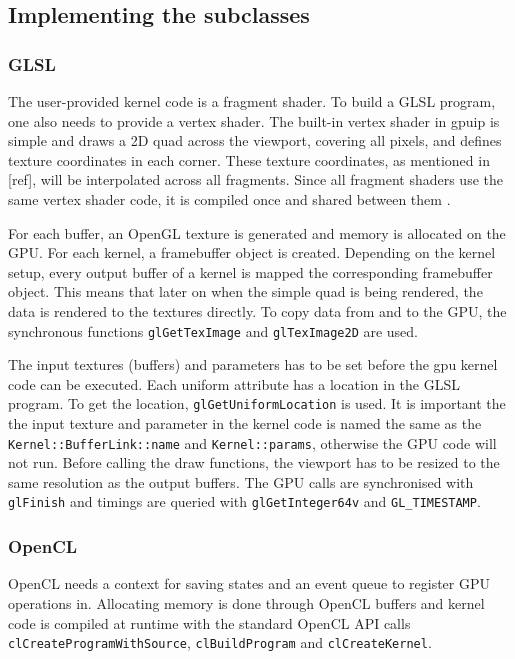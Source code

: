 \subsection{Implementing the subclasses}
\subsubsection{GLSL}
The user-provided kernel code is a fragment shader. To build a GLSL program, one also needs to provide a vertex shader. The built-in vertex shader in gpuip is simple and draws a 2D quad across the viewport, covering all pixels, and defines texture coordinates in each corner. These texture coordinates, as mentioned in [ref], will be interpolated across all fragments. Since all fragment shaders use the same vertex shader code, it is compiled once and shared between them
.
\newline

For each buffer, an OpenGL texture is generated and memory is allocated on the GPU. For each kernel, a framebuffer object is created. Depending on the kernel setup, every output buffer of a kernel is mapped the corresponding framebuffer object. This means that later on when the simple quad is being rendered, the data is rendered to the textures directly. To copy data from and to the GPU, the synchronous functions {\tt glGetTexImage} and {\tt glTexImage2D} are used.
\newline

The input textures (buffers) and parameters has to be set before the gpu kernel code can be executed. Each uniform attribute has a location in the GLSL program. To get the location, {\tt glGetUniformLocation} is used. It is important the the input texture and parameter in the kernel code is named the same as the {\tt Kernel::BufferLink::name} and {\tt Kernel::params}, otherwise the GPU code will not run. Before calling the draw functions, the viewport has to be resized to the same resolution as the output buffers. The GPU calls are synchronised with {\tt glFinish} and timings are queried with {\tt glGetInteger64v} and {\tt GL\_TIMESTAMP}.

\subsubsection{OpenCL}

OpenCL needs a context for saving states and an event queue to register GPU operations in. Allocating memory is done through OpenCL buffers and kernel code is compiled at runtime with the standard OpenCL API calls {\tt clCreateProgramWithSource}, {\tt clBuildProgram} and {\tt clCreateKernel}.
\newline

